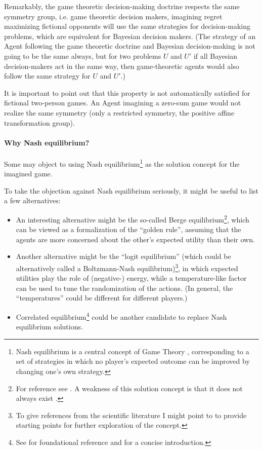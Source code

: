 \documentclass{article}
\begin{document}
Remarkably, the game theoretic decision-making doctrine respects the same symmetry group, i.e. game theoretic decision makers, imagining regret maximizing fictional opponents will use the same strategies for decision-making problems, which are equivalent for Bayesian decision makers. (The strategy of an Agent following the game theoretic doctrine and Bayesian decision-making is not going to be the same always, but for two problems $U$ and $U'$ if all Bayesian decision-makers act in the same way, then game-theoretic agents would also follow the same strategy for $U$ and $U'$.)

It is important to point out that this property is not automatically satisfied for fictional two-person games. An Agent imagining a zero-sum game would not realize the same symmetry (only a restricted symmetry, the positive affine transformation group).

\paragraph{Why Nash equilibrium?}
Some may object to using Nash equilibrium\footnote{Nash equilibrium is a central concept of Game Theory \cite{book:EssentialGameTheory,book:GameTheory,review:NeumannMorgensternGameThoery,book:GameTheoryOriginal}, corresponding to a set of strategies in which no player's expected outcome can be improved by changing one's own strategy.} as the solution concept for the imagined game.

To take the objection against Nash equilibrium seriously, it might be useful to list a few alternatives:
\begin{itemize}
    \item An interesting alternative might be the so-called Berge equilibrium\footnote{For reference see \cite{book:BergeEquilibrium}. A weakness of this solution concept is that it does not always exist \cite{paper:NoBergeEquilibria}.}, which can be viewed as a formalization of the ``golden rule'', assuming that the agents are more concerned about the other's expected utility than their own.
    \item Another alternative might be the ``logit equilibrium'' (which could be alternatively called a Boltzmann-Nash equilibrium)\footnote{To give references from the scientific literature I might point to \cite{paper:LogitEquilibrium,arxiv:WolpertEquilibrium} to provide starting points for further exploration of the concept.}, in which expected utilities play the role of (negative-) energy, while a temperature-like factor can be used to tune the randomization of the actions. (In general, the ``temperatures'' could be different for different players.)
    \item Correlated equilibrium\footnote{See \cite{paper:CorrelatedEquilibrium} for foundational reference and \cite{book:EssentialGameTheory} for a concise introduction.} could be another candidate to replace Nash equilibrium solutions.
\end{itemize}
\end{document}
